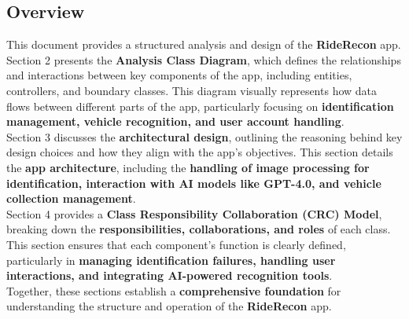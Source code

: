 \documentclass[]{article}
\begin{document}

\subsection{Overview}
\label{sub:overview}
This document provides a structured analysis and design of the \textbf{RideRecon} app. Section 2 presents the \textbf{Analysis Class Diagram}, which defines the relationships and interactions between key components of the app, including entities, controllers, and boundary classes. This diagram visually represents how data flows between different parts of the app, particularly focusing on \textbf{identification management, vehicle recognition, and user account handling}.  \\
 
\noindent Section 3 discusses the \textbf{architectural design}, outlining the reasoning behind key design choices and how they align with the app's objectives. This section details the \textbf{app architecture}, including the \textbf{handling of image processing for identification, interaction with AI models like GPT-4.0, and vehicle collection management}.  \\
 
\noindent Section 4 provides a \textbf{Class Responsibility Collaboration (CRC) Model}, breaking down the \textbf{responsibilities, collaborations, and roles} of each class. This section ensures that each component's function is clearly defined, particularly in \textbf{managing identification failures, handling user interactions, and integrating AI-powered recognition tools}.  \\
 
\noindent Together, these sections establish a \textbf{comprehensive foundation} for understanding the structure and operation of the \textbf{RideRecon} app.


\end{document}
